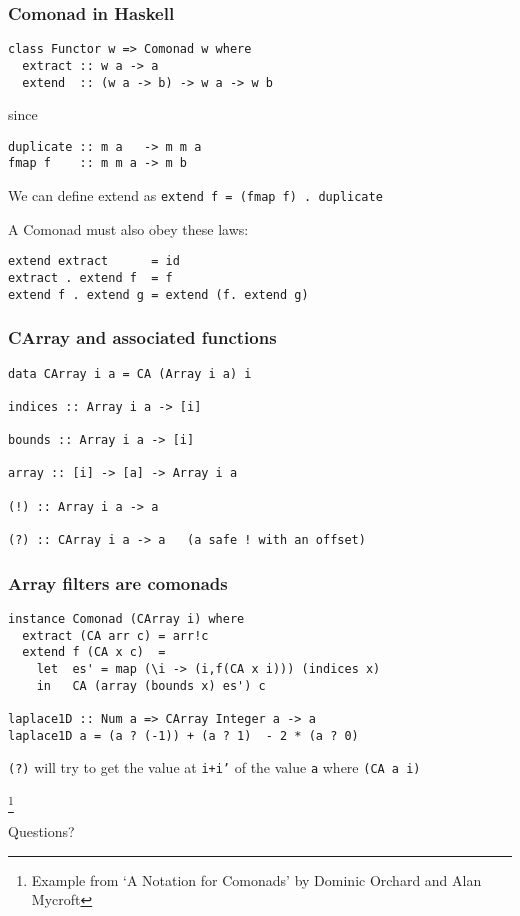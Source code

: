\documentclass{beamer} %
\newcommand\blfootnote[1]{%
  \begingroup
  \renewcommand\thefootnote{}\footnote{#1}%
  \addtocounter{footnote}{-1}%
  \endgroup
}
\begin{document}
\begin{frame}[fragile]\frametitle{Comonad in Haskell}
\begin{verbatim}
class Functor w => Comonad w where
  extract :: w a -> a
  extend  :: (w a -> b) -> w a -> w b
\end{verbatim}
since
\begin{verbatim}
duplicate :: m a   -> m m a
fmap f    :: m m a -> m b
\end{verbatim}
We can define extend as \texttt{extend f = (fmap f) . duplicate}

A Comonad must also obey these laws:
\begin{verbatim}
extend extract      = id
extract . extend f  = f
extend f . extend g = extend (f. extend g)
\end{verbatim}
\end{frame}

\begin{frame}[fragile]\frametitle{CArray and associated functions}
\begin{verbatim}
data CArray i a = CA (Array i a) i 

indices :: Array i a -> [i]

bounds :: Array i a -> [i]

array :: [i] -> [a] -> Array i a

(!) :: Array i a -> a

(?) :: CArray i a -> a   (a safe ! with an offset)
\end{verbatim}
\end{frame}

\begin{frame}[fragile]\frametitle{Array filters are comonads}

\begin{verbatim}
instance Comonad (CArray i) where
  extract (CA arr c) = arr!c
  extend f (CA x c)  =
    let  es' = map (\i -> (i,f(CA x i))) (indices x)
    in   CA (array (bounds x) es') c

laplace1D :: Num a => CArray Integer a -> a
laplace1D a = (a ? (-1)) + (a ? 1)  - 2 * (a ? 0)
\end{verbatim}
\texttt{(?)} will try to get the value at \texttt{i+i'} of the value \texttt{a}
where \texttt{(CA a i)}

\blfootnote{Example from `A Notation for Comonads' by Dominic Orchard and Alan Mycroft}
\end{frame}

\begin{frame}
  \center \Huge Questions?
\end{frame}
\end{document}
